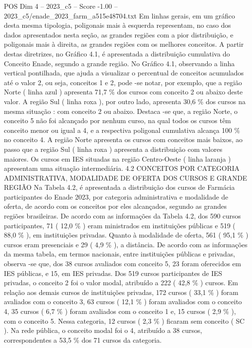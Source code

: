 \begin{textsample}{POS Dim 4 – 2023\_c5 – Score -1.00 – 2023\_c5/enade\_2023\_farm\_a515e48704.txt}
Em linhas gerais, em um gráfico desta mesma tipologia, poligonais mais à esquerda representam, no caso dos dados apresentados nesta seção, as grandes regiões com a pior distribuição, e poligonais mais à direita, as grandes regiões com os melhores conceitos.
A partir destas diretrizes, no Gráfico 4.1, é apresentada a distribuição cumulativa do Conceito Enade, segundo a grande região.
No Gráfico 4.1, observando a linha vertical pontilhada, que ajuda a visualizar o percentual de conceitos acumulados até o valor 2, ou seja, conceitos 1 e 2, pode -se notar, por exemplo, que a região Norte ( linha azul ) apresenta 71,7 \% dos cursos com conceito 2 ou abaixo deste valor.
A região Sul ( linha roxa ), por outro lado, apresenta 30,6 \% dos cursos na mesma situação : com conceito 2 ou abaixo.
Destaca -se que, a região Norte, o conceito 5 não foi alcançado por nenhum curso, na qual todos os cursos têm conceito menor ou igual a 4, e a respectiva poligonal cumulativa alcança 100 \% no conceito 4.
A região Norte apresenta os cursos com conceitos mais baixos, ao passo que a região Sul ( linha roxa ) apresenta a distribuição com valores maiores.
Os cursos em IES situadas na região Centro-Oeste ( linha laranja ) apresentam uma situação intermediária. 4.2 CONCEITOS POR CATEGORIA ADMINISTRATIVA, MODALIDADE DE OFERTA DOS CURSOS E GRANDE REGIÃO Na Tabela 4.2, é apresentada a distribuição dos cursos de Farmácia participantes do Enade 2023, por categoria administrativa e modalidade de oferta, de acordo com os conceitos por eles alcançados, segundo as grandes regiões brasileiras.
De acordo com as informações da Tabela 4.2, dos 590 cursos participantes, 71 ( 12,0 \% ) eram ministrados em instituições públicas e 519 ( 88,0 \% ), em instituições privadas.
Quanto à modalidade de oferta, 561 ( 95,1 \% ) cursos eram presenciais e 29 ( 4,9 \% ), a distância.
De acordo com as informações da mesma tabela, em termos nacionais, entre instituições públicas e privadas, observa -se que, dos 38 cursos avaliados com conceito 5, 23 foram oferecidos em IES públicas, e 15, em IES privadas.
Dos 519 cursos participantes de IES privadas, o conceito 2 foi o valor modal, atribuído a 222 ( 42,8 \% ) cursos.
Em relação aos demais cursos de instituições privadas, 172 cursos ( 33,1 \% ) foram avaliados com o conceito 3, 63 cursos ( 12,1 \% ) foram avaliados com o conceito 4, 35 cursos ( 6,7 \% ) foram avaliados com o conceito 1 e, 15 cursos ( 2,9 \% ), com o conceito 5.
Nessa categoria, 12 cursos ( 2,3 \% ) ficaram sem conceito ( SC ).
Na rede pública, o conceito modal foi o 4, atribuído a 38 cursos, correspondentes a 53,5 \% dos 71 cursos da categoria.

\end{textsample}
